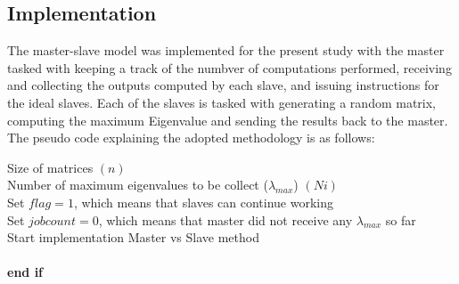 \documentclass[11pt, oneside]{article}
\begin{document}
	
\subsection{Implementation}
The master-slave model was implemented for the present study with the master tasked with keeping a track of the numbver of computations performed, receiving and collecting the outputs computed by each slave, and issuing instructions for the ideal slaves. Each of the slaves is tasked with generating a random matrix, computing the maximum Eigenvalue and sending the results back to the master. The pseudo code explaining the adopted methodology is as follows: 

\begin{algorithm}
Size of matrices $(n)$\\
Number of maximum eigenvalues to be collect ($\lambda _{max}$) $(Ni)$ \\
Set $\textit{flag}=1$, which means that slaves can continue working \\
Set $\textit{jobcount}=0$, which means that master did not receive any $\lambda _{max}$ so far\\
Start implementation Master vs Slave method\\~\\

\textbf{end if} \\


\end{algorithm}
\end{document}
